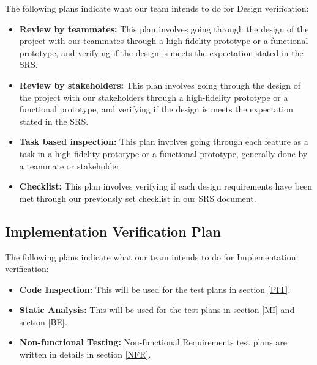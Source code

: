 \documentclass[12pt, titlepage]{article}
\begin{document}
The following plans indicate what our team intends to do for Design verification:
\begin{itemize}
    \item \textbf{Review by teammates:} This plan involves going through the design of the project with our teammates through a high-fidelity prototype or a functional prototype, and verifying if the design is meets the expectation stated in the SRS.
    \item \textbf{Review by stakeholders:} This plan involves going through the design of the project with our stakeholders through a high-fidelity prototype or a functional prototype, and verifying if the design is meets the expectation stated in the SRS.
    \item \textbf{Task based inspection:} This plan involves going through each feature as a task in a high-fidelity prototype or a functional prototype, generally done by a teammate or stakeholder.
    \item \textbf{Checklist:} This plan involves verifying if each design requirements have been met through our previously set checklist in our SRS document.
\end{itemize}

\subsection{Implementation Verification Plan}
The following plans indicate what our team intends to do for Implementation verification:
\begin{itemize}
    \item \textbf{Code Inspection:} This will be used for the test plans in section \ref{PIT}.
    \item \textbf{Static Analysis:} This will be used for the test plans in section \ref{MI} and section \ref{BE}.
    \item \textbf{Non-functional Testing:} Non-functional Requirements test plans are written in details in section \ref{NFR}.
\end{itemize}
\end{document}
